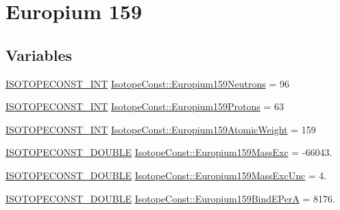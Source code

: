 \hypertarget{group___isotope_const-_europium-_eu159}{}\section{Europium 159}
\label{group___isotope_const-_europium-_eu159}
\subsection*{Variables}
\begin{DoxyCompactItemize}
\item 
\mbox{\hyperlink{group___isotope_const-_macros_ga5f18360b3e99483a35c32d789e62621c}{I\+S\+O\+T\+O\+P\+E\+C\+O\+N\+S\+T\+\_\+\+I\+NT}} \mbox{\hyperlink{group___isotope_const-_europium-_eu159_gafe8c437ff932a9de6984aa33a2a8541a}{Isotope\+Const\+::\+Europium159\+Neutrons}} = 96
\item 
\mbox{\hyperlink{group___isotope_const-_macros_ga5f18360b3e99483a35c32d789e62621c}{I\+S\+O\+T\+O\+P\+E\+C\+O\+N\+S\+T\+\_\+\+I\+NT}} \mbox{\hyperlink{group___isotope_const-_europium-_eu159_ga28c62a97505b897626c99f26fc461b42}{Isotope\+Const\+::\+Europium159\+Protons}} = 63
\item 
\mbox{\hyperlink{group___isotope_const-_macros_ga5f18360b3e99483a35c32d789e62621c}{I\+S\+O\+T\+O\+P\+E\+C\+O\+N\+S\+T\+\_\+\+I\+NT}} \mbox{\hyperlink{group___isotope_const-_europium-_eu159_gaf13c5a90840e0a3aa1062e809773c6f7}{Isotope\+Const\+::\+Europium159\+Atomic\+Weight}} = 159
\item 
\mbox{\hyperlink{group___isotope_const-_macros_ga8f45a7272ce02c0b4c65c44636ed719a}{I\+S\+O\+T\+O\+P\+E\+C\+O\+N\+S\+T\+\_\+\+D\+O\+U\+B\+LE}} \mbox{\hyperlink{group___isotope_const-_europium-_eu159_gaebd86e7e3a008727a84cf15f71d3038f}{Isotope\+Const\+::\+Europium159\+Mass\+Exc}} = -\/66043.
\item 
\mbox{\hyperlink{group___isotope_const-_macros_ga8f45a7272ce02c0b4c65c44636ed719a}{I\+S\+O\+T\+O\+P\+E\+C\+O\+N\+S\+T\+\_\+\+D\+O\+U\+B\+LE}} \mbox{\hyperlink{group___isotope_const-_europium-_eu159_ga0d0d17de953115383791926d30750661}{Isotope\+Const\+::\+Europium159\+Mass\+Exc\+Unc}} = 4.
\item 
\mbox{\hyperlink{group___isotope_const-_macros_ga8f45a7272ce02c0b4c65c44636ed719a}{I\+S\+O\+T\+O\+P\+E\+C\+O\+N\+S\+T\+\_\+\+D\+O\+U\+B\+LE}} \mbox{\hyperlink{group___isotope_const-_europium-_eu159_ga789073f7a1f401dd12b331e48ac110c2}{Isotope\+Const\+::\+Europium159\+Bind\+E\+PerA}} = 8176.
\item 

\end{DoxyCompactItemize}
